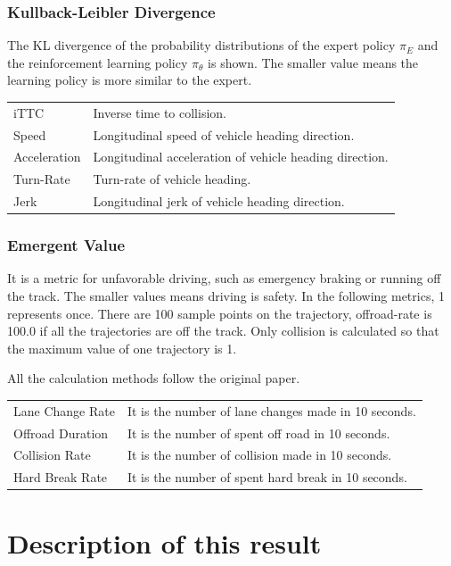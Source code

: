 \subsubsection{Kullback-Leibler Divergence}

The KL divergence of the probability distributions of the expert policy $\pi_E$ and the reinforcement learning policy $\pi_\theta$ is shown. The smaller  value means the learning policy is more similar to the expert.

\begin{tabular}{ll}
iTTC  & Inverse time to collision. \\
Speed & Longitudinal speed of vehicle heading direction. \\
Acceleration & Longitudinal acceleration of vehicle heading direction. \\
Turn-Rate & Turn-rate of vehicle heading. \\
Jerk & Longitudinal jerk of vehicle heading direction. \\
\end{tabular}


\subsubsection{Emergent Value}

It is a metric for unfavorable driving, such as emergency braking or running off the track. The smaller values means driving is safety.
In the following metrics, 1 represents once.
There are 100 sample points on the trajectory, 
offroad-rate is 100.0 if all the trajectories are off the track.
Only collision is calculated so that the maximum value of one trajectory is 1.

All the calculation methods follow the original paper.\cite{DBLP:journals/corr/KueflerMWK17}


\begin{tabular}{ll}
Lane Change Rate & It is the number of lane changes made in 10 seconds. \\
Offroad Duration & It is the number of spent off road in 10 seconds. \\
Collision Rate   & It is the number of collision made in 10 seconds. \\
Hard Break Rate  & It is the number of spent hard break in 10 seconds. \\
\end{tabular}


\section{Description of this result}

